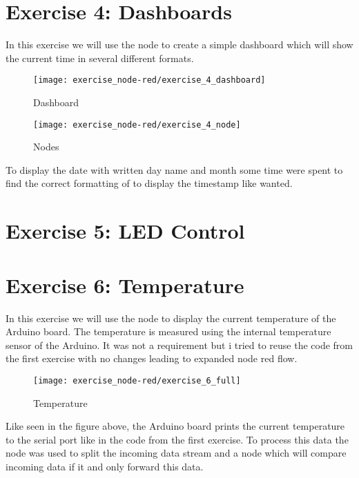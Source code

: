 \section{Exercise 4: Dashboards}

In this exercise we will use the  node to create a simple dashboard which will 
show the current time in several different formats.

\begin{figure}[H]
  \centering
  \texttt{[image: exercise\_node-red/exercise\_4\_dashboard]}
  \caption{Dashboard}
  \label{fig:dashboard}
\end{figure}

\begin{figure}[H]
  \centering
  \texttt{[image: exercise\_node-red/exercise\_4\_node]}
  \caption{Nodes}
  \label{fig:4_nodes}
\end{figure}

To display the date with written day name and month some time were spent to find the correct 
formatting of  to display the timestamp like wanted.


\section{Exercise 5: LED Control}



\section{Exercise 6: Temperature}

In this exercise we will use the  node to display the current temperature of the 
Arduino board. The temperature is measured using the internal temperature sensor of the Arduino. 
It was not a requirement but i tried to reuse the code from the first exercise with no changes 
leading to expanded node red flow.

\begin{figure}[H]
  \centering
  \texttt{[image: exercise\_node-red/exercise\_6\_full]}
  \caption{Temperature}
  \label{fig:temperature}
\end{figure}

Like seen in the figure above, the Arduino board prints the current temperature to the serial port 
like in the code from the first exercise. To process this data the  node was used to 
split the incoming data stream and a  node which will compare incoming data if it 
 and only forward this data.

